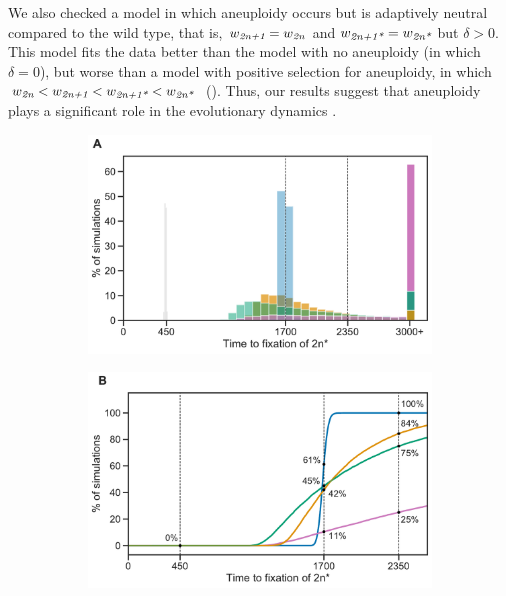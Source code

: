 \documentclass[12pt]{extarticle}
\newcommand{\euwt}{\emph{2n}}
\newcommand{\anwt}{\emph{2n+1}}
\newcommand{\eumt}{\emph{2n*}}
\newcommand{\anmt}{\emph{2n+1*}}
\begin{document}
We also checked a model in which aneuploidy occurs but is adaptively neutral compared to the wild type, that is, $w_{\anwt} = w_{\euwt}$ and $w_{\anmt} = w_{\eumt}$ but $\delta>0$. This model fits the data better than the model with no aneuploidy (in which $\delta=0$), but worse than a model with positive selection for aneuploidy, in which $w_{\euwt}<w_{\anwt}<w_{\anmt}<w_{\eumt}$~(). 
Thus, our results suggest that aneuploidy plays a significant role in the evolutionary dynamics \citep{Yona2012,Yona2015}.

\begin{figure}[h!]
  \begin{subfigure}{0.5\textwidth}
      \centering
      \includegraphics[width=\textwidth]{../figures/fixation-plot-a.pdf}      
      \label{fig:fit}
  \end{subfigure}
  \begin{subfigure}{0.5\textwidth}
      \centering
      \includegraphics[width=\textwidth]{../figures/fixation-plot-b.pdf}      

\end{subfigure}
\end{figure}
\end{document}
